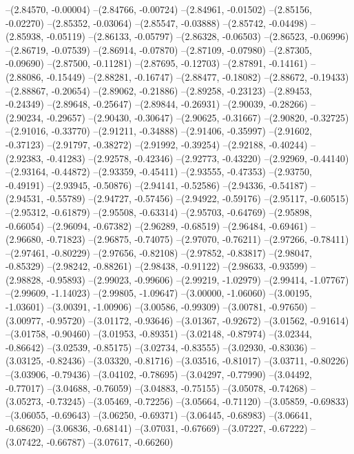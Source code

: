 --(2.84570, -0.00004)
--(2.84766, -0.00724)
--(2.84961, -0.01502)
--(2.85156, -0.02270)
--(2.85352, -0.03064)
--(2.85547, -0.03888)
--(2.85742, -0.04498)
--(2.85938, -0.05119)
--(2.86133, -0.05797)
--(2.86328, -0.06503)
--(2.86523, -0.06996)
--(2.86719, -0.07539)
--(2.86914, -0.07870)
--(2.87109, -0.07980)
--(2.87305, -0.09690)
--(2.87500, -0.11281)
--(2.87695, -0.12703)
--(2.87891, -0.14161)
--(2.88086, -0.15449)
--(2.88281, -0.16747)
--(2.88477, -0.18082)
--(2.88672, -0.19433)
--(2.88867, -0.20654)
--(2.89062, -0.21886)
--(2.89258, -0.23123)
--(2.89453, -0.24349)
--(2.89648, -0.25647)
--(2.89844, -0.26931)
--(2.90039, -0.28266)
--(2.90234, -0.29657)
--(2.90430, -0.30647)
--(2.90625, -0.31667)
--(2.90820, -0.32725)
--(2.91016, -0.33770)
--(2.91211, -0.34888)
--(2.91406, -0.35997)
--(2.91602, -0.37123)
--(2.91797, -0.38272)
--(2.91992, -0.39254)
--(2.92188, -0.40244)
--(2.92383, -0.41283)
--(2.92578, -0.42346)
--(2.92773, -0.43220)
--(2.92969, -0.44140)
--(2.93164, -0.44872)
--(2.93359, -0.45411)
--(2.93555, -0.47353)
--(2.93750, -0.49191)
--(2.93945, -0.50876)
--(2.94141, -0.52586)
--(2.94336, -0.54187)
--(2.94531, -0.55789)
--(2.94727, -0.57456)
--(2.94922, -0.59176)
--(2.95117, -0.60515)
--(2.95312, -0.61879)
--(2.95508, -0.63314)
--(2.95703, -0.64769)
--(2.95898, -0.66054)
--(2.96094, -0.67382)
--(2.96289, -0.68519)
--(2.96484, -0.69461)
--(2.96680, -0.71823)
--(2.96875, -0.74075)
--(2.97070, -0.76211)
--(2.97266, -0.78411)
--(2.97461, -0.80229)
--(2.97656, -0.82108)
--(2.97852, -0.83817)
--(2.98047, -0.85329)
--(2.98242, -0.88261)
--(2.98438, -0.91122)
--(2.98633, -0.93599)
--(2.98828, -0.95893)
--(2.99023, -0.99606)
--(2.99219, -1.02979)
--(2.99414, -1.07767)
--(2.99609, -1.14023)
--(2.99805, -1.09647)
--(3.00000, -1.06060)
--(3.00195, -1.03601)
--(3.00391, -1.00906)
--(3.00586, -0.99309)
--(3.00781, -0.97650)
--(3.00977, -0.95720)
--(3.01172, -0.93646)
--(3.01367, -0.92672)
--(3.01562, -0.91614)
--(3.01758, -0.90460)
--(3.01953, -0.89351)
--(3.02148, -0.87974)
--(3.02344, -0.86642)
--(3.02539, -0.85175)
--(3.02734, -0.83555)
--(3.02930, -0.83036)
--(3.03125, -0.82436)
--(3.03320, -0.81716)
--(3.03516, -0.81017)
--(3.03711, -0.80226)
--(3.03906, -0.79436)
--(3.04102, -0.78695)
--(3.04297, -0.77990)
--(3.04492, -0.77017)
--(3.04688, -0.76059)
--(3.04883, -0.75155)
--(3.05078, -0.74268)
--(3.05273, -0.73245)
--(3.05469, -0.72256)
--(3.05664, -0.71120)
--(3.05859, -0.69833)
--(3.06055, -0.69643)
--(3.06250, -0.69371)
--(3.06445, -0.68983)
--(3.06641, -0.68620)
--(3.06836, -0.68141)
--(3.07031, -0.67669)
--(3.07227, -0.67222)
--(3.07422, -0.66787)
--(3.07617, -0.66260)
